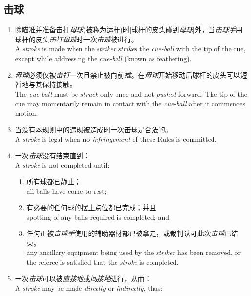\subsection{击球}

\begin{enumerate}[label=(\alph*)]
    \item 除瞄准并准备击打\textit{母球}(被称为运杆)时[球杆的皮头碰到\textit{母球}]外，当\textit{击球手}用球杆的皮头\textit{击打}\textit{母球}时一次\textit{击球}被进行。\\
    A \textit{stroke} is made when the \textit{striker} \textit{strikes} the \textit{cue-ball} with the tip of the cue, except while addressing the \textit{cue-ball} (known as feathering).
    \item \textit{母球}必须仅被\textit{击打}一次且禁止被向前\textit{推}。在\textit{母球}开始移动后球杆的皮头可以短暂地与其保持接触。\\
    The \textit{cue-ball} must be \textit{struck} only once and not \textit{pushed} forward. The tip of the cue may momentarily remain in contact with the \textit{cue-ball} after it commences motion.
    \item 当没有本规则中的违规被造成时一次击球是合法的。\\
    A \textit{stroke} is legal when no \textit{infringement} of these Rules is committed.
    \item 一次\textit{击球}没有结束直到：\\
    A \textit{stroke} is not completed until:
    \begin{enumerate}[label=(\roman*)]
        \item 所有球都已静止；\\
        all balls have come to rest;
        \item 有必要的任何球的摆上点位都已完成；并且\\
        spotting of any balls required is completed; and
        \item 任何正被\textit{击球手}使用的辅助器材都已被拿走，或裁判认可此次\textit{击球}已结束。\\
        any ancillary equipment being used by the \textit{striker} has been removed, or the referee is satisfied that the \textit{stroke} is completed.
    \end{enumerate}
    \item 一次\textit{击球}可以被\textit{直接地}或\textit{间接地}进行，从而：\\
    A \textit{stroke} may be made \textit{directly} or \textit{indirectly}, thus:

\end{enumerate}
